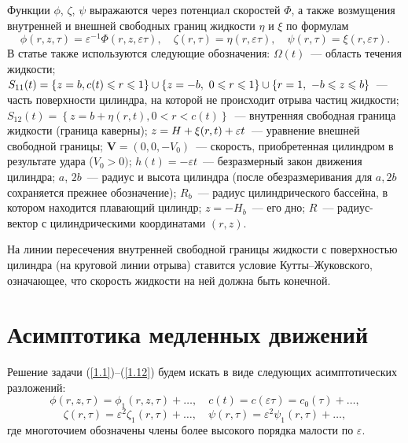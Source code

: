 \documentclass[press]{vestnik}
\begin{document}
Функции $\phi$, $\zeta$, $\psi $ выражаются через потенциал скоростей $\Phi $, а 
также возмущения внутренней и внешней свободных границ жидкости $\eta $ и 
$\xi $ по формулам
\[
\phi (r,z,\tau )=\varepsilon^{-1}\Phi (r,z,\varepsilon \tau ),
\quad
\zeta (r,\tau )=\eta (r,\varepsilon \tau ),
\quad
\psi (r,\tau )=\xi (r,\varepsilon \tau ).
\]
В статье также используются следующие обозначения: $\Omega (t)$~--- область 
течения жидкости; $S_{11} (t)=\left\{ {z=b,c(t)\leqslant r\leqslant 1} \right\}\cup 
\left\{ {z=-b,\ 0\leqslant r\leqslant 1} \right\}\dm\cup \left\{ {r=1,\ -b\leqslant z\leqslant b} \right\}$~--- часть поверхности цилиндра, на которой не происходит отрыва частиц 
жидкости; $S_{12} (t)=\left\{ {z=b+\eta (r,t),0<r<c(t)} \right\}$~--- 
внутренняя свободная граница жидкости (граница каверны); $z\dm=H+\xi 
(r,t)+\varepsilon t$~--- уравнение внешней свободной границы; $\bm V=(0, 0, -V_{0} )$~--- скорость, приобретенная цилиндром в результате 
удара ($V_{0} >0)$; $h(t)=-\varepsilon t$~--- безразмерный закон движения 
цилиндра; $a$, $2b$~--- радиус и высота цилиндра (после обезразмеривания для 
$a,2b$ сохраняется прежнее обозначение); $R_{b} $~--- радиус цилиндрического 
бассейна, в котором находится плавающий цилиндр; $z=-H_{b} $~--- его дно; 
$R$~--- радиус-вектор с цилиндрическими координатами $(r,z)$.

На линии пересечения внутренней свободной границы жидкости с поверхностью 
цилиндра (на круговой линии отрыва) ставится условие Кутты--Жуковского, 
означающее, что скорость жидкости на ней должна быть конечной.


\section{Асимптотика медленных движений}

Решение задачи (\ref{1.1})--(\ref{1.12}) будем искать в виде следующих асимптотических 
разложений: 
\begin{equation}
\label{eq1}
\phi (r,z,\tau )=\phi_{1} (r,z,\tau )+\ldots,
\quad
c(t)=c(\varepsilon \tau )=c_{0} (\tau )+\ldots,
\end{equation}
\begin{equation}
\label{eq2}
\zeta (r,\tau )=\varepsilon^{2}\zeta_{1} (r,\tau )+\ldots,
\quad
\psi (r,\tau )=\varepsilon^{2}\psi_{1} (r,\tau )+\ldots,
\end{equation}
где многоточием обозначены члены более высокого порядка малости по 
$\varepsilon $.
\end{document}
